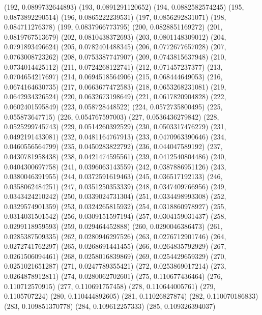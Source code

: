 {					(192, 0.0899732644893)
					(193, 0.0891291120652)
					(194, 0.0882582574245)
					(195, 0.0873892290514)
					(196, 0.0865222239531)
					(197, 0.0856292831071)
					(198, 0.084711276378)
					(199, 0.0837966773795)
					(200, 0.0828851169272)
					(201, 0.0819767513679)
					(202, 0.0810438372693)
					(203, 0.0801148309012)
					(204, 0.0791893496624)
					(205, 0.0782401488345)
					(206, 0.0772677657028)
					(207, 0.0763008723262)
					(208, 0.0753387747907)
					(209, 0.0743815637948)
					(210, 0.0734014425112)
					(211, 0.0724268122741)
					(212, 0.071457237377)
					(213, 0.0704654217697)
					(214, 0.0694518564906)
					(215, 0.068444649053)
					(216, 0.0674164630735)
					(217, 0.0663677472583)
					(218, 0.0653268231081)
					(219, 0.0642934326524)
					(220, 0.0632673198649)
					(221, 0.0617820904828)
					(222, 0.0602401595849)
					(223, 0.058728448522)
					(224, 0.0572735800495)
					(225, 0.055873647715)
					(226, 0.054767597003)
					(227, 0.0536436279842)
					(228, 0.0525299745743)
					(229, 0.0514260392529)
					(230, 0.0503317476279)
					(231, 0.0492191433081)
					(232, 0.0481164767913)
					(233, 0.0470963390646)
					(234, 0.0460556564799)
					(235, 0.0450283822792)
					(236, 0.044047589192)
					(237, 0.0430781958438)
					(238, 0.0421474595561)
					(239, 0.0412540804486)
					(240, 0.0404300697758)
					(241, 0.0396063143559)
					(242, 0.0387886951126)
					(243, 0.0380046391955)
					(244, 0.0372591619463)
					(245, 0.036517192133)
					(246, 0.0358062484251)
					(247, 0.0351250353339)
					(248, 0.0347409766956)
					(249, 0.0343424210242)
					(250, 0.0339024731304)
					(251, 0.0334498993308)
					(252, 0.0329574901359)
					(253, 0.0324265815932)
					(254, 0.0318860978927)
					(255, 0.0314031501542)
					(256, 0.0309151597194)
					(257, 0.0304159031437)
					(258, 0.0299118959593)
					(259, 0.029464452888)
					(260, 0.0290046386473)
					(261, 0.0285387509335)
					(262, 0.0280946297526)
					(263, 0.0276712901746)
					(264, 0.0272741762297)
					(265, 0.0268691441455)
					(266, 0.0264835792929)
					(267, 0.0261506094461)
					(268, 0.0258016839869)
					(269, 0.0254429659329)
					(270, 0.0251021651287)
					(271, 0.0247789355421)
					(272, 0.0253869017214)
					(273, 0.0264878912811)
					(274, 0.0280062702601)
					(275, 0.110677436464)
					(276, 0.110712570915)
					(277, 0.110691757458)
					(278, 0.110644005761)
					(279, 0.1105707224)
					(280, 0.110444892605)
					(281, 0.11026827874)
					(282, 0.110070186833)
					(283, 0.109851370778)
					(284, 0.109612257333)
					(285, 0.109326394037)
}
